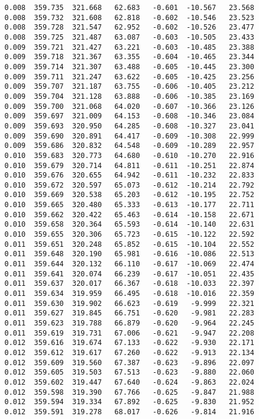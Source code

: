 \begin{verbatim}
   0.008  359.735  321.668   62.683   -0.601  -10.567   23.568
   0.008  359.732  321.608   62.818   -0.602  -10.546   23.523
   0.008  359.728  321.547   62.952   -0.602  -10.526   23.477
   0.008  359.725  321.487   63.087   -0.603  -10.505   23.433
   0.009  359.721  321.427   63.221   -0.603  -10.485   23.388
   0.009  359.718  321.367   63.355   -0.604  -10.465   23.344
   0.009  359.714  321.307   63.488   -0.605  -10.445   23.300
   0.009  359.711  321.247   63.622   -0.605  -10.425   23.256
   0.009  359.707  321.187   63.755   -0.606  -10.405   23.212
   0.009  359.704  321.128   63.888   -0.606  -10.385   23.169
   0.009  359.700  321.068   64.020   -0.607  -10.366   23.126
   0.009  359.697  321.009   64.153   -0.608  -10.346   23.084
   0.009  359.693  320.950   64.285   -0.608  -10.327   23.041
   0.009  359.690  320.891   64.417   -0.609  -10.308   22.999
   0.009  359.686  320.832   64.548   -0.609  -10.289   22.957
   0.010  359.683  320.773   64.680   -0.610  -10.270   22.916
   0.010  359.679  320.714   64.811   -0.611  -10.251   22.874
   0.010  359.676  320.655   64.942   -0.611  -10.232   22.833
   0.010  359.672  320.597   65.073   -0.612  -10.214   22.792
   0.010  359.669  320.538   65.203   -0.612  -10.195   22.752
   0.010  359.665  320.480   65.333   -0.613  -10.177   22.711
   0.010  359.662  320.422   65.463   -0.614  -10.158   22.671
   0.010  359.658  320.364   65.593   -0.614  -10.140   22.631
   0.010  359.655  320.306   65.723   -0.615  -10.122   22.592
   0.011  359.651  320.248   65.852   -0.615  -10.104   22.552
   0.011  359.648  320.190   65.981   -0.616  -10.086   22.513
   0.011  359.644  320.132   66.110   -0.617  -10.069   22.474
   0.011  359.641  320.074   66.239   -0.617  -10.051   22.435
   0.011  359.637  320.017   66.367   -0.618  -10.033   22.397
   0.011  359.634  319.959   66.495   -0.618  -10.016   22.359
   0.011  359.630  319.902   66.623   -0.619   -9.999   22.321
   0.011  359.627  319.845   66.751   -0.620   -9.981   22.283
   0.011  359.623  319.788   66.879   -0.620   -9.964   22.245
   0.011  359.619  319.731   67.006   -0.621   -9.947   22.208
   0.012  359.616  319.674   67.133   -0.622   -9.930   22.171
   0.012  359.612  319.617   67.260   -0.622   -9.913   22.134
   0.012  359.609  319.560   67.387   -0.623   -9.896   22.097
   0.012  359.605  319.503   67.513   -0.623   -9.880   22.060
   0.012  359.602  319.447   67.640   -0.624   -9.863   22.024
   0.012  359.598  319.390   67.766   -0.625   -9.847   21.988
   0.012  359.594  319.334   67.892   -0.625   -9.830   21.952
   0.012  359.591  319.278   68.017   -0.626   -9.814   21.916

\end{verbatim}
